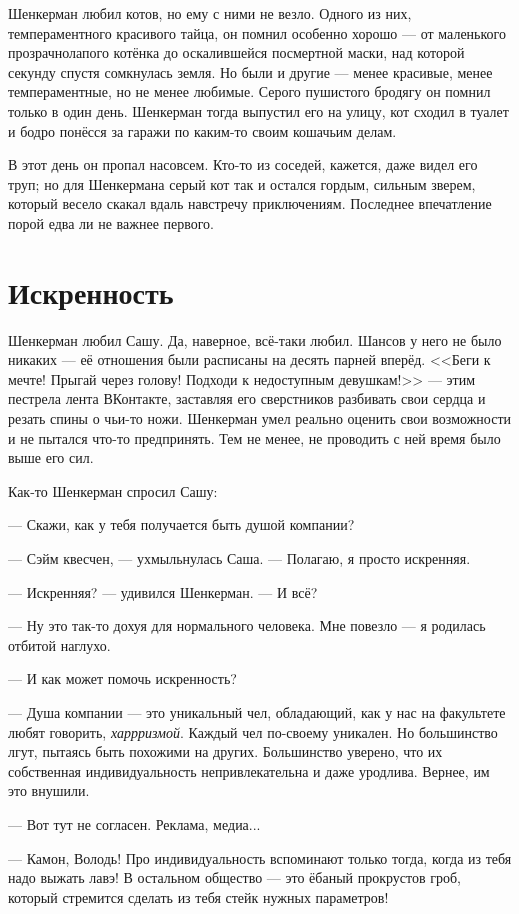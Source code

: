 \documentclass[a4paper,10pt,fleqn]{book}\usepackage{polyglossia}\setdefaultlanguage{english}\setotherlanguage{russian}\defaultfontfeatures{Ligatures=TeX,Mapping=tex-text} \usepackage{xcolor}\definecolor{lightgray}{HTML}{bbbbbb}\color{lightgray}\newcommand{\ml}[3]{\textcolor{black}{#3}}
\begin{document}
Шенкерман любил котов, но ему с ними не везло.
Одного из них, темпераментного красивого тайца, он помнил особенно хорошо --- от маленького прозрачнолапого котёнка до оскалившейся посмертной маски, над которой секунду спустя сомкнулась земля.
Но были и другие --- менее красивые, менее темпераментные, но не менее любимые.
Серого пушистого бродягу он помнил только в один день.
Шенкерман тогда выпустил его на улицу, кот сходил в туалет и бодро понёсся за гаражи по каким-то своим кошачьим делам.

В этот день он пропал насовсем.
Кто-то из соседей, кажется, даже видел его труп;
но для Шенкермана серый кот так и остался гордым, сильным зверем, который весело скакал вдаль навстречу приключениям.
Последнее впечатление порой едва ли не важнее первого.

\section{Искренность}

Шенкерман любил Сашу.
Да, наверное, всё-таки любил.
Шансов у него не было никаких --- её отношения были расписаны на десять парней вперёд.
<<Беги к мечте!
Прыгай через голову!
Подходи к недоступным девушкам!>> --- этим пестрела лента ВКонтакте, заставляя его сверстников разбивать свои сердца и резать спины о чьи-то ножи.
Шенкерман умел реально оценить свои возможности и не пытался что-то предпринять.
Тем не менее, не проводить с ней время было выше его сил.

Как-то Шенкерман спросил Сашу:

--- Скажи, как у тебя получается быть душой компании?

--- Сэйм квесчен, --- ухмыльнулась Саша.
--- Полагаю, я просто искренняя.

--- Искренняя? --- удивился Шенкерман.
--- И всё?

--- Ну это так-то дохуя для нормального человека.
Мне повезло --- я родилась отбитой наглухо.

--- И как может помочь искренность?

--- Душа компании --- это уникальный чел, обладающий, как у нас на факультете любят говорить, \emph{харрризмой}.
Каждый чел по-своему уникален.
Но большинство лгут, пытаясь быть похожими на других.
Большинство уверено, что их собственная индивидуальность непривлекательна и даже уродлива.
Вернее, им это внушили.

--- Вот тут не согласен.
Реклама, медиа...

--- Камон, Володь!
Про индивидуальность вспоминают только тогда, когда из тебя надо выжать лавэ!
В остальном общество --- это ёбаный прокрустов гроб, который стремится сделать из тебя стейк нужных параметров!
\end{document}
